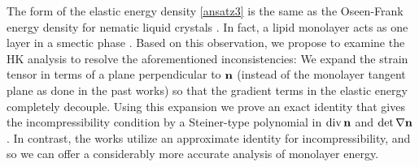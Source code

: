  The form of the elastic energy density \eqref{ansatz3} is the same as
  the Oseen-Frank energy density for nematic liquid crystals \cite{ANDRIENKO2018520,Tran7106,Helfrich73}.   In fact,  
  a lipid monolayer acts as one layer in a smectic  phase \cite{REYESMATEO1995978,Rangamani20140463,PhysRevLett.113.248102}. 
  Based on this observation, we propose to examine the HK analysis to resolve the aforementioned inconsistencies: We expand the strain tensor in terms of a plane
  perpendicular to ${\bf n}$ (instead of the monolayer tangent plane as done in the past works) so that the gradient terms in the elastic energy completely decouple. 
  Using this expansion we prove an exact identity 
  that gives the incompressibility condition by a Steiner-type polynomial in $\operatorname{div} {\bf n}$ and $\det \nabla {\bf n}$ \cite{Fe59}.
  In contrast, the works \cite{TerziDeserno17, PhysRevE.102.042406, Hamm2000, C9SM02079A} utilize an
  approximate identity for incompressibility, and so we can offer a considerably more accurate analysis of monolayer energy.

%
%  
%
